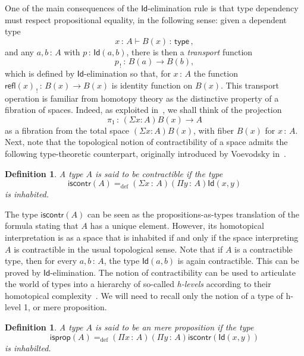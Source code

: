 \documentclass[10pt,a4paper,oneside,reqno]{amsart}
\numberwithin{equation}{section}
\theoremstyle{mythm}
\theoremstyle{mydef}
\newtheorem{definition}[theorem]{Definition}
\theoremstyle{myrmk}
\newcommand{\defeq}{=_{\mathrm{def}}}
\newcommand{\co}{\,{:}\,}
\newcommand{\type}{\mathsf{type}}
\newcommand{\iscontr}{\mathsf{iscontr}}
\newcommand{\isprop}{\mathsf{isprop}}
\newcommand{\Id}{\mathsf{Id}}
\newcommand{\refl}{\mathsf{refl}}
\begin{document}
One of the main consequences of the 
$\Id$-elimination rule is that  type dependency must respect propositional equality, in the following sense: given a dependent type
\begin{equation*}
x\co A \vdash B(x) \co \type \, ,
\end{equation*} 
and any $a,b\co A$ with $p\co \Id(a,b)$, there is then a \emph{transport} function 
 $$p_{\, ! } \co B(a) \rightarrow B(b),$$ which is defined by $\Id$-elimination so that, for $x \co A$
the function $\refl(x)_{\, !} \co B(x) \rightarrow B(x)$ is identity function on $B(x)$.  This transport operation is familiar from homotopy theory as the distinctive property of a fibration of spaces.  Indeed, as exploited
in~\cite{AwodeyS:homtmi}, we shall think of the projection 
\[
\pi_1 \co (\Sigma x:A) B(x) \to A
\] 
as a fibration from the total space $(\Sigma x:A)B(x)$, with fiber $B(x)$ for $x\co A$.
Next, note that the topological notion of contractibility of a space admits the following type-theoretic counterpart, originally
 introduced by Voevodsky in~\cite{VoevodskyV:unifc}.

\begin{definition}  A type $A$ is said to be \emph{contractible} if the  type 
 \begin{equation}
 \label{eq:contractible}
\iscontr(A) \defeq (\Sigma x\co A) (\Pi y\co A) \Id(x,y)
\end{equation}
is inhabited.
\end{definition} 

The type $\iscontr(A)$ can be seen as the propositions-as-types translation
of the formula stating that $A$ has a unique element. However, its homotopical interpretation 
is as a space that is inhabited if and only if the space interpreting $A$ is contractible in the usual
topological sense. Note that if $A$ is a contractible type, then for every $a, b \co A$, the type $\Id(a,b)$ is again contractible. 
This can be proved  by $\Id$-elimination. 
The notion of contractibility can be used to articulate the world of types  into a hierarchy of so-called \emph{h-levels} according to their
homotopical complexity~\cite{VoevodskyV:unifc}. We will need to recall only the notion of a type of h-level 1, or 
mere proposition.

\begin{definition} A type $A$ is said to be an \emph{mere proposition} if the type
\[
\isprop(A) \defeq (\Pi x \co A)(\Pi  y \co A) \iscontr( \Id(x,y)) 
\]
is inhabilted.
\end{definition}
\end{document}
